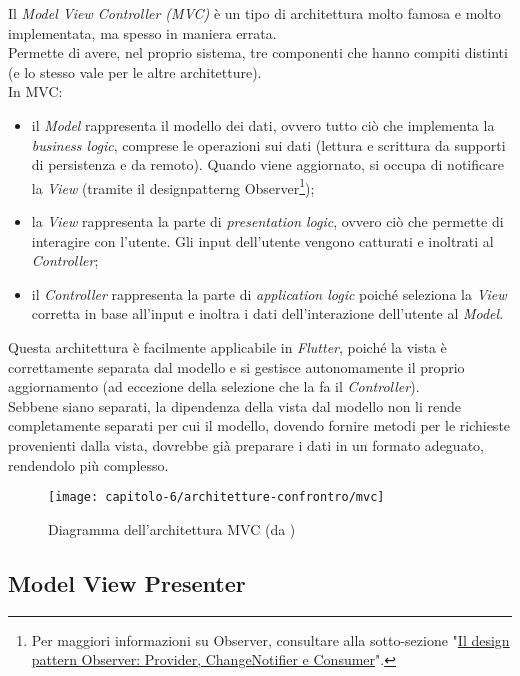 Il \emph{Model View Controller (MVC)} è un tipo di architettura molto famosa e molto implementata, ma spesso in maniera errata.\\
Permette di avere, nel proprio sistema, tre componenti che hanno compiti distinti (e lo stesso vale per le altre architetture).\\
In MVC:
\begin{itemize}
    \item il \emph{Model} rappresenta il modello dei dati, ovvero tutto ciò che implementa la \emph{business logic}, comprese le operazioni sui dati (lettura e scrittura da supporti di persistenza e da remoto). Quando viene aggiornato, si occupa di notificare la \emph{View} (tramite il \gls{designpatterng} Observer\footnote{Per maggiori informazioni su Observer, consultare alla sotto-sezione "\hyperref[subsec:observer-provider-changenotifier]{Il design pattern Observer: Provider, ChangeNotifier e Consumer}".});
    \item la \emph{View} rappresenta la parte di \emph{presentation logic}, ovvero ciò che permette di interagire con l'utente. Gli input dell'utente vengono catturati e inoltrati al \emph{Controller};
    \item il \emph{Controller} rappresenta la parte di \emph{application logic} poiché seleziona la \emph{View} corretta in base all'input e inoltra i dati dell'interazione dell'utente al \emph{Model}.
\end{itemize}
Questa architettura è facilmente applicabile in \emph{Flutter}, poiché la vista è correttamente separata dal modello e si gestisce autonomamente il proprio aggiornamento (ad eccezione della selezione che la fa il \emph{Controller}).\\
Sebbene siano separati, la dipendenza della vista dal modello non li rende completamente separati per cui il modello, dovendo fornire metodi per le richieste provenienti dalla vista, dovrebbe già preparare i dati in un formato adeguato, rendendolo più complesso.

\begin{figure}[!h]
    \centering 
    \texttt{[image: capitolo-6/architetture-confrontro/mvc]} 
    \caption{Diagramma dell'architettura MVC (da \cite{site:mvc})}
\end{figure}

\subsection{Model View Presenter}
\label{subsec:model-view-presenter}

